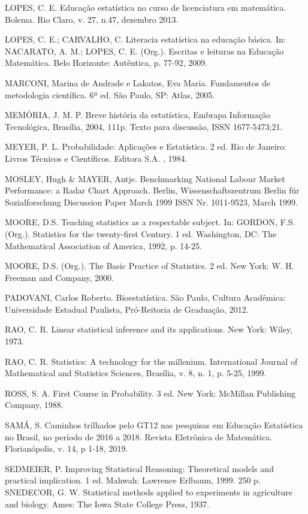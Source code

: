 LOPES, C. E. Educação estatística no curso de licenciatura em matemática. Bolema. Rio Claro, v. 27, n.47,  dezembro 2013.
\vskip0.3cm

LOPES, C. E.; CARVALHO, C. Literacia estatística na educação básica. In: NACARATO, A. M.; LOPES, C. E. (Org.). Escritas e leituras na Educação Matemática. Belo Horizonte:  Autêntica, p. 77-92, 2009.\vskip0.3cm

MARCONI, Marina de Andrade e Lakatos, Eva Maria. Fundamentos de metodologia científica. 6ª ed. São Paulo, SP: Atlas, 2005.\vskip0.3cm

MEMÓRIA, J. M. P. Breve história da estatística, Embrapa Informação Tecnológica, Brasília, 2004, 111p. Texto para discussão, ISSN 1677-5473;21. \vskip0.3cm

MEYER, P. L. Probabilidade: Aplicações e Estatística. 2 ed.
Rio de Janeiro: Livros Técnicos e Científicos. Editora S.A. ,
1984.\vskip0.3cm

MOSLEY, Hugh \& MAYER, Antje. Benchmarking National Labour Market
Performance: a Radar Chart Approach. Berlin, Wissenschaftszentrum Berlin
für Sozialforschung Discussion Paper March 1999 ISSN Nr. 1011-9523, March
1999.\vskip0.3cm


MOORE, D.S. Teaching statistics as a respectable subject. In: GORDON, F.S. (Org.). Statistics for the twenty-first Century. 1 ed. Washington, DC: The Mathematical Association of America, 1992, p. 14-25.\vskip0.3cm

MOORE, D.S. (Org.). The Basic Practice of Statistics. 2 ed. New York: W. H. Freeman and Company, 2000. \vskip0.3cm

PADOVANI, Carlos Roberto. Bioestatística. São Paulo, Cultura Acadêmica:
Universidade Estadual Paulista, Pró-Reitoria de Graduação, 2012.\vskip0.3cm

RAO, C. R. Linear statistical inference and its applications. New York: Wiley, 1973.\vskip0.3cm

RAO, C. R. Statistics: A technology for the millenium. International Journal of Mathematical and Statistics Sciences, Brasília, v. 8, n. 1, p. 5-25, 1999.\vskip0.3cm

ROSS, S. A. First Course in Probability. 3 ed. New York:
McMillan Publishing Company, 1988.\vskip0.3cm

SAMÁ, S. Caminhos trilhados pelo GT12 nas pesquisas em Educação Estatística no Brasil, no período de 2016 a 2018. Revista Eletrônica de Matemática. Florianópolis, v. 14, p 1-18, 2019.\vskip0.3cm

SEDMEIER, P. Improving Statistical Reasoning: Theoretical models and practical implication. 1 ed. Mahwah: Lawrence Erlbaum, 1999. 250 p.\vskip0.3cm
SNEDECOR, G. W. Statistical methods applied to experiments in agriculture and biology. Ames: The Iowa State College Press, 1937. \vskip0.3cm

